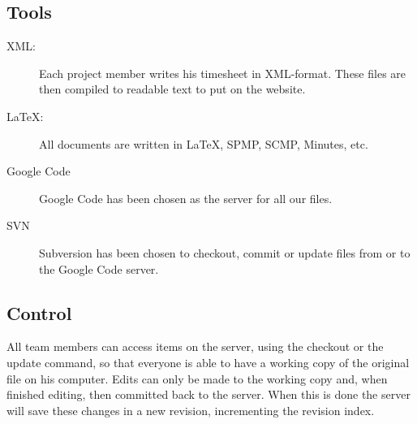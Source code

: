 \documentclass{article}
\begin{document}
	\subsection{Tools}
		\begin{description}
			\item[XML:]
				Each project member writes his timesheet in XML-format. These files are then compiled to readable text to put on the website.
			\item[\LaTeX{}:]
				All documents are written in \LaTeX{}, SPMP, SCMP, Minutes, etc.
			\item[Google Code]
				Google Code has been chosen as the server for all our files.
			\item[SVN]
				Subversion has been chosen to checkout, commit or update files from or to the Google Code server.
		\end{description}
	\subsection{Control}
	All team members can access items on the server, using the checkout or the update command, so that everyone is able to have a working copy of the original file on his computer.
	Edits can only be made to the working copy and, when finished editing, then committed back to the server.
	When this is done the server will save these changes in a new revision, incrementing the revision index.
\end{document}
